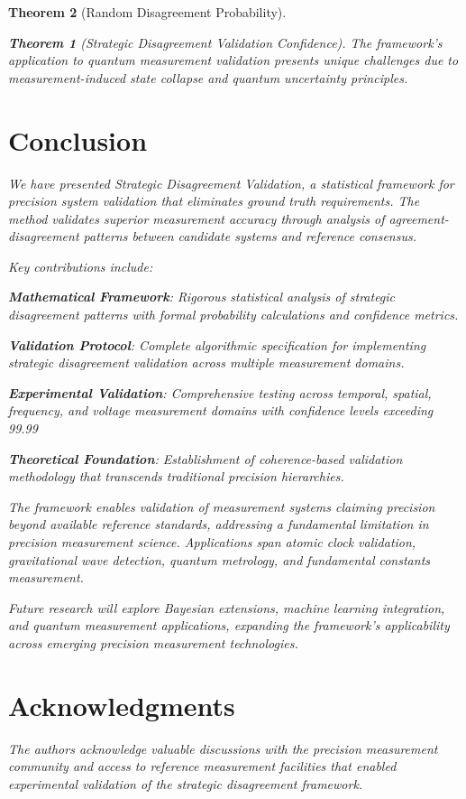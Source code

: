 \documentclass[12pt,a4paper]{article}
\newtheorem{theorem}{Theorem}
\begin{document}
\begin{theorem}[Random Disagreement Probability]
\begin{theorem}[Strategic Disagreement Validation Confidence]
The framework's application to quantum measurement validation presents unique challenges due to measurement-induced state collapse and quantum uncertainty principles.

\section{Conclusion}

We have presented Strategic Disagreement Validation, a statistical framework for precision system validation that eliminates ground truth requirements. The method validates superior measurement accuracy through analysis of agreement-disagreement patterns between candidate systems and reference consensus.

Key contributions include:

\textbf{Mathematical Framework}: Rigorous statistical analysis of strategic disagreement patterns with formal probability calculations and confidence metrics.

\textbf{Validation Protocol}: Complete algorithmic specification for implementing strategic disagreement validation across multiple measurement domains.

\textbf{Experimental Validation}: Comprehensive testing across temporal, spatial, frequency, and voltage measurement domains with confidence levels exceeding 99.99%

\textbf{Theoretical Foundation}: Establishment of coherence-based validation methodology that transcends traditional precision hierarchies.

The framework enables validation of measurement systems claiming precision beyond available reference standards, addressing a fundamental limitation in precision measurement science. Applications span atomic clock validation, gravitational wave detection, quantum metrology, and fundamental constants measurement.

Future research will explore Bayesian extensions, machine learning integration, and quantum measurement applications, expanding the framework's applicability across emerging precision measurement technologies.

\section*{Acknowledgments}

The authors acknowledge valuable discussions with the precision measurement community and access to reference measurement facilities that enabled experimental validation of the strategic disagreement framework.


\end{theorem}
\end{theorem}
\end{document}
